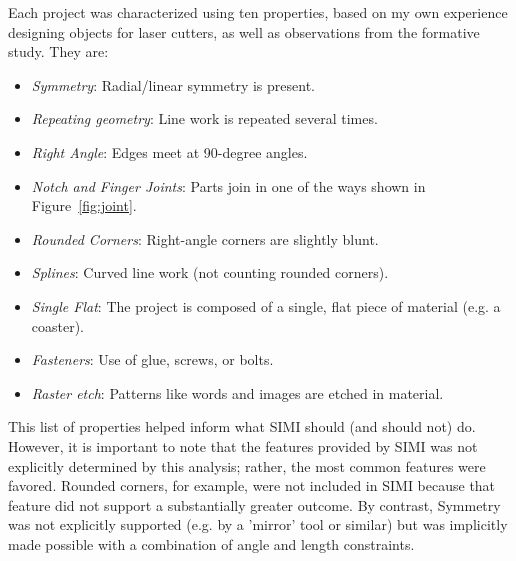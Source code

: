 Each project was characterized using ten properties, based on my own
experience designing objects for laser cutters, as well as
observations from the formative study. They are:

\begin{itemize}
\item \textit{Symmetry}: Radial/linear symmetry is present.
\item \textit{Repeating geometry}: Line work is repeated several times.
\item \textit{Right Angle}: Edges meet at 90-degree angles.
\item \textit{Notch and Finger Joints}: Parts join in one of the ways
  shown in Figure~\ref{fig:joint}.
\item \textit{Rounded Corners}: Right-angle corners are slightly blunt.
\item \textit{Splines}: Curved line work (not counting rounded corners).
\item \textit{Single Flat}: The project is composed of a single, flat
  piece of material (e.g. a coaster).
\item \textit{Fasteners}: Use of glue, screws, or bolts.
\item \textit{Raster etch}: Patterns like words and images are etched
  in material.
\end{itemize}

This list of properties helped inform what SIMI should (and should
not) do. However, it is important to note that the features provided
by SIMI was not explicitly determined by this analysis; rather, the
most common features were favored. Rounded corners, for example, were
not included in SIMI because that feature did not support a
substantially greater outcome. By contrast, Symmetry was not
explicitly supported (e.g. by a 'mirror' tool or similar) but was
implicitly made possible with a combination of angle and length
constraints.






